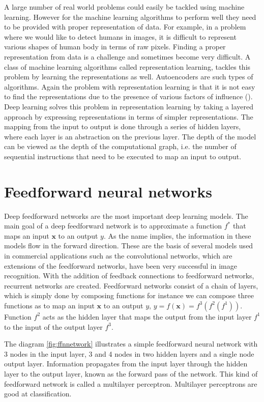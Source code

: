 A large number of real world problems could easily be tackled using machine learning. However for
the machine learning algorithms to perform well they need to be provided with proper representation
of data. For example, in a problem where we would like to detect humans in images, it is
difficult to represent various shapes of human body in terms of raw pixels. Finding a proper
representation from data is a challenge and sometimes become very difficult. A class of machine
learning algorithms called representation learning, tackles this problem by learning the
representations as well. Autoencoders are such types of algorithms. Again the problem with
representation learning is that it is not easy to find the representations due to the presence of
various factors of influence (\citet{bengio2015deep}). Deep learning solves this problem in
representation learning by taking a layered approach by expressing representations in terms of
simpler representations. The mapping from the input to output is done through a series of hidden
layers, where each layer is an abstraction on the previous layer. The depth of the model can be
viewed as the depth of the computational graph, i.e. the number of sequential instructions that
need to be executed to map an input to output.

\section{Feedforward neural networks}
Deep feedforward networks are the most important deep learning models. The main goal of a deep
feedforward network is to approximate a function $f^{*}$ that maps an input $\textbf{x}$ to an
output $y$. As the name implies, the information in these models flow in the forward direction.
These are the basis of several models used in commercial applications such as the convolutional
networks, which are extensions of the feedforward networks, have been very successful in image
recognition. With the addition of feedback connections to feedforward networks, recurrent
networks are created. Feedforward networks consist of a chain of layers, which is simply done by
composing functions for instance we can compose three functions as to map an input $\textbf{x}$
to an output $y$, $y = f(\textbf{x}) = f^{3}(f^{2}(f^{1}))$. Function $f^{2}$ acts as the hidden
layer that maps the output from the input layer $f^{1}$ to the input of the output layer $f^{3}$.

The diagram \ref{fig:ffnnetwork} illustrates a simple feedforward neural network with 3 nodes in
the input layer, 3 and 4 nodes in two hidden layers and a single node output layer. Information
propagates from the input layer through the hidden layer to the output layer, known as the
forward pass of the network. This kind of feedforward network is called a multilayer perceptron.
Multilayer perceptrons are good at classification.

